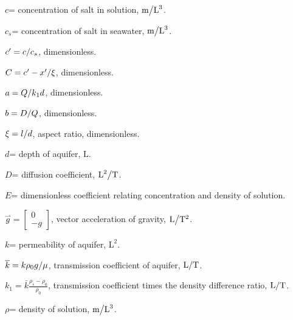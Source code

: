 \documentclass{article}
\begin{document}
$c$= concentration of salt in solution, ${ \text{m} \mathord{\left/ {\vphantom
{ \text{m L} ^{3} }} \right. \kern-\nulldelimiterspace} \text{L} ^{{\rm
3}} } $.

$c_{s} $= concentration of salt in seawater, ${ \text{m} \mathord{\left/ {\vphantom
{ \text{m L} ^{3} }} \right. \kern-\nulldelimiterspace} \text{L} ^{{\rm
3}} } $.

$c'={c\mathord{\left/ {\vphantom {c c_{s} }} \right. \kern-\nulldelimiterspace}
c_{s} } $, dimensionless.

$C=c'-{x'\mathord{\left/ {\vphantom {x' \xi }} \right.
\kern-\nulldelimiterspace} \xi } $, dimensionless.

$a={Q\mathord{\left/ {\vphantom {Q k_{1} d}} \right. \kern-\nulldelimiterspace}
k_{1} d} $, dimensionless.

$b={D\mathord{\left/ {\vphantom {D Q}} \right. \kern-\nulldelimiterspace} Q} $,
dimensionless.

$\xi ={l\mathord{\left/ {\vphantom {l d}} \right. \kern-\nulldelimiterspace} d}
$, aspect ratio, dimensionless.

$d$= depth of aquifer, $ \text{L} $.

$D$= diffusion coefficient, ${ \text{L} ^{2} \mathord{\left/ {\vphantom {{\rm
L}^{2} \text{T} }} \right. \kern-\nulldelimiterspace} \text{T} } $.

$E$= dimensionless coefficient relating concentration and density of solution.

$\stackrel{\rightharpoonup}{g}=\left[\begin{array}{c} {0} \\ {-g}
\end{array} \right]$, vector acceleration of gravity, ${ \text{L} \mathord{\left/
{\vphantom { \text{L T} ^{2} }} \right. \kern-\nulldelimiterspace} {\rm
T}^{2} } $.

$k$= permeability of aquifer, $ \text{L} ^{2} $.

$\bar{k}={k\rho _{0} g\mathord{\left/ {\vphantom {k\rho _{0} g \mu }} \right.
\kern-\nulldelimiterspace} \mu } $, transmission coefficient of aquifer, ${{\rm
L} \mathord{\left/ {\vphantom { \text{L T} }} \right.
\kern-\nulldelimiterspace} \text{T} } $.

$k_{1} =\bar{k} \frac{\rho _{s} -\rho _{0} }{\rho _{0} } $, transmission
coefficient times the density difference ratio, ${ \text{L} \mathord{\left/
{\vphantom { \text{L T} }} \right. \kern-\nulldelimiterspace} \text{T} } $.

$\rho $= density of solution, ${ \text{m} \mathord{\left/ {\vphantom { \text{m}  {\rm
L}^{3} }} \right. \kern-\nulldelimiterspace} \text{L} ^{3} } $.
\end{document}
